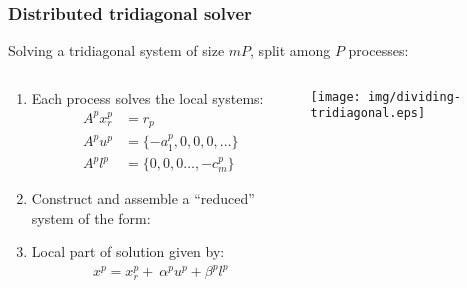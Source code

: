 \begin{frame}
\frametitle{Distributed tridiagonal solver}

Solving a tridiagonal system of size
$mP$, split among $P$ processes:

\footnotesize
\begin{columns}
\begin{column}{0.5\textwidth}
\begin{enumerate}
\item Each process solves the local systems:
    \begin{align*}
        A^px_r^{p} &= r_p \\
        A^pu^p &= \{-a_1^p, 0, 0, 0, \hdots\} \\
        A^pl^p &= \{0, 0, 0 \hdots, -c_m^p\}
    \end{align*}
\item Construct and assemble a ``reduced'' system
    of the form:
\item Local part of solution given by:
\begin{align*}
x^p = x_r^p + \
    \alpha^p u^p + \beta^p l^p
\end{align*}
\end{enumerate}
\end{column}
\begin{column}{0.5\textwidth}
\centering
\texttt{[image: img/dividing-tridiagonal.eps]}
\end{column}
\end{columns}
\end{frame}

